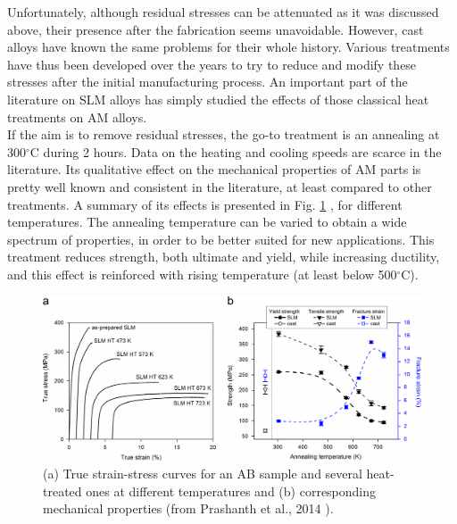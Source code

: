 Unfortunately, although residual stresses can be attenuated as it was discussed above, their presence after the fabrication seems unavoidable. However, cast alloys have known the same problems for their whole history. Various treatments have thus been developed over the years to try to reduce and modify these stresses after the initial manufacturing process. An important part of the literature on SLM alloys has simply studied the effects of those classical heat treatments on AM alloys.\\

If the aim is to remove residual stresses, the go-to treatment is an annealing at 300$^\circ$C during 2 hours. Data on the heating and cooling speeds are scarce in the literature. Its qualitative effect on the mechanical properties of AM parts is pretty well known and consistent in the literature, at least compared to other treatments. A summary of its effects is presented in Fig. \ref{fig:mech_annealing} \cite{PRASHANTH14}, for different temperatures. The annealing temperature can be varied to obtain a wide spectrum of properties, in order to be better suited for new applications. This treatment reduces strength, both ultimate and yield, while increasing ductility, and this effect is reinforced with rising temperature (at least below 500$^\circ$C). \\

\begin{figure}[ht]
	\centering
	\includegraphics[scale=0.30]{Images/mech_annealing}
	\decoRule
	\caption[Principal residual stresses as a function of the depth relative to the surface. Sample B is built onto an undefined hollow support, while A is not]{(a) True strain-stress curves for an AB sample and several heat-treated ones at different temperatures and (b) corresponding mechanical properties (from Prashanth et al., 2014 \parencite{PRASHANTH14}).}
	\label{fig:mech_annealing}
\end{figure}

